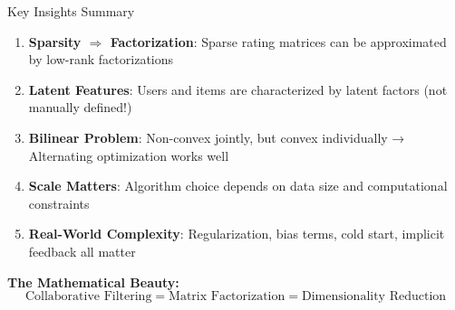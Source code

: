 \documentclass{beamer}
\begin{document}
\begin{frame}{Key Insights Summary}
\begin{enumerate}[<+->]
    \item \textbf{Sparsity $\Rightarrow$ Factorization}: Sparse rating matrices can be approximated by low-rank factorizations
    
    \item \textbf{Latent Features}: Users and items are characterized by latent factors (not manually defined!)
    
    \item \textbf{Bilinear Problem}: Non-convex jointly, but convex individually → Alternating optimization works well
    
    \item \textbf{Scale Matters}: Algorithm choice depends on data size and computational constraints
    
    \item \textbf{Real-World Complexity}: Regularization, bias terms, cold start, implicit feedback all matter
\end{enumerate}

\pause
\textbf{The Mathematical Beauty:}
\begin{equation*}
\boxed{\text{Collaborative Filtering} = \text{Matrix Factorization} = \text{Dimensionality Reduction}}
\end{equation*}
\end{frame}
\end{document}
